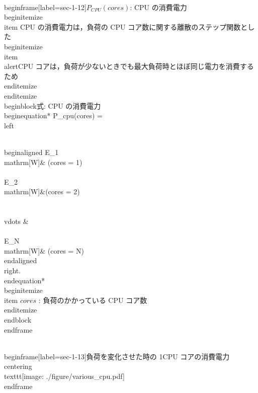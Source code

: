 {\\begin{frame}[label=sec-1-12]{$P_{CPU}(cores)$: CPU の消費電力}
\\begin{itemize}
\\item CPU の消費電力は，負荷の CPU コア数に関する離散のステップ関数とし
た
\\begin{itemize}
\\item \\alert{CPU コアは，負荷が少ないときでも最大負荷時とほぼ同じ電力を消費するため}
\\end{itemize}
\\end{itemize}
\\begin{block}{式: CPU の消費電力}%
\\begin{equation*}
P_{cpu}(cores) = 
     \\left\\{
       \\begin{aligned}
         E_{1} \\mathrm{[W]}& (cores = 1) \\\\
         E_{2} \\mathrm{[W]}&(cores = 2) \\\\
         \\vdots  & \\\\
         E_{N} \\mathrm{[W]}& (cores = N)
       \\end{aligned}
     \\right.
\\end{equation*}
\\begin{itemize}
\\item $cores$ : 負荷のかかっている CPU コア数
\\end{itemize}
\\end{block}
\\end{frame}

\\begin{frame}[label=sec-1-13]{負荷を変化させた時の 1CPU コアの消費電力}
\\centering
\\texttt{[image: ./figure/various\_cpu.pdf]}
\\end{frame}

}}
